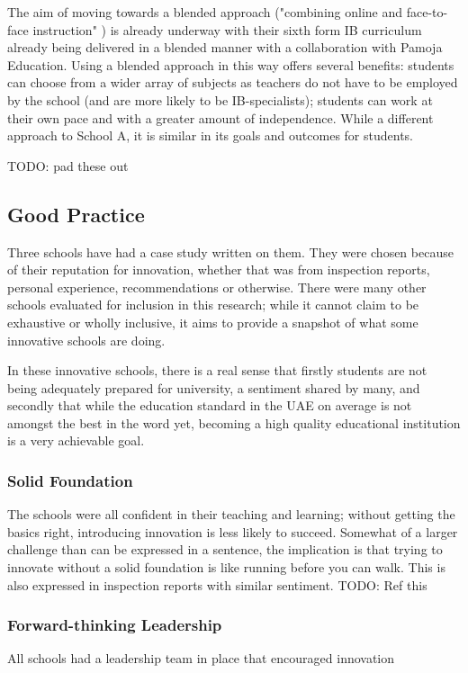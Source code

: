 The aim of moving towards a blended approach ("combining online and face-to-face instruction" \cite{bonk2006handbook}) is already underway with their sixth form IB curriculum already being delivered in a blended manner with a collaboration with Pamoja Education. Using a blended approach in this way offers several benefits: students can choose from a wider array of subjects as teachers do not have to be employed by the school (and are more likely to be IB-specialists); students can work at their own pace and with a greater amount of independence. While a different approach to School A, it is similar in its goals and outcomes for students.

TODO: pad these out

\subsection{Good Practice}
Three schools have had a case study written on them. They were chosen because of their reputation for innovation, whether that was from inspection reports, personal experience, recommendations or otherwise. There were many other schools evaluated for inclusion in this research; while it cannot claim to be exhaustive or wholly inclusive, it aims to provide a snapshot of what some innovative schools are doing. 

In these innovative schools, there is a real sense that firstly students are not being adequately prepared for university, a sentiment shared by many, \citep{Ali2016,Moussly2012} and secondly that while the education standard in the UAE on average is not amongst the best in the word yet, \cite{2013} becoming a high quality educational institution is a very achievable goal.

\subsubsection{Solid Foundation}
The schools were all confident in their teaching and learning; without getting the basics right, introducing innovation is less likely to succeed. Somewhat of a larger challenge than can be expressed in a sentence, the implication is that trying to innovate without a solid foundation is like running before you can walk. This is also expressed in inspection reports with similar sentiment. TODO: Ref this

\subsubsection{Forward-thinking Leadership}
All schools had a leadership team in place that encouraged innovation 

